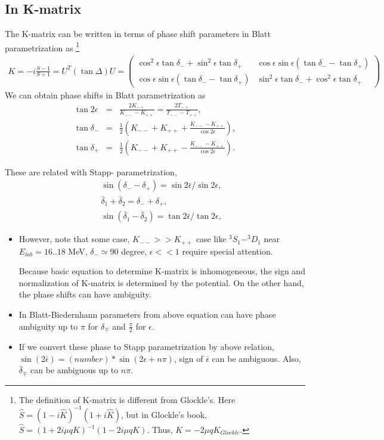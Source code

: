 \documentclass[10pt]{article}
\newcommand{\bea}{\begin{eqnarray}}
\newcommand{\eea}{\end{eqnarray}}
\newcommand{\no}{\nonumber \\}
\begin{document}
\subsection{In K-matrix}
The K-matrix can be written in terms of phase shift parameters
in Blatt parametrization as
\footnote{
The definition of K-matrix is different  from Glockle's.
Here $\hat{S}=(1-i\hat K)^{-1}(1+i\hat{K})$, but in 
Glockle's book, $\hat{S}=(1+2i\mu q K)^{-1}(1-2i\mu q K)$.
Thus, $K=-2\mu q K_{Glockle}$.
}
\bea
K=-i\frac{S-1}{S+1}=U^T (\tan\Delta) U
 =\left(\begin{array}{cc}
   \cos^2\epsilon\tan\delta_{-}+\sin^2\epsilon\tan\delta_{+} &
   \cos\epsilon\sin\epsilon(\tan\delta_{-}-\tan\delta_{+})\\
   \cos\epsilon\sin\epsilon(\tan\delta_{-}-\tan\delta_{+}) &
   \sin^2\epsilon\tan\delta_{-}+\cos^2\epsilon\tan\delta_{+} 
   \end{array}
 \right) 
\eea
We can obtain phase shifts in Blatt parametrization as
\bea
\tan 2\epsilon &=& \frac{2 K_{-+}}{K_{--}-K_{++}}
                =\frac{2 T_{-+}}{T_{--}-T_{++}}  ,\no
\tan \delta_{-} &=& 
    \frac{1}{2}\left(K_{--}+K_{++}
    +\frac{K_{--}-K_{++}}{\cos 2\epsilon}\right),\no
\tan\delta_{+} &=&
     \frac{1}{2}\left(K_{--}+K_{++}
    -\frac{K_{--}-K_{++}}{\cos 2\epsilon}\right).
\eea

These are related with Stapp- parametrization,
\bea
& &\sin(\delta_{-}-\delta_{+})=\sin 2\bar{\epsilon}/\sin 2\epsilon,\no
& &\bar{\delta}_1+\bar{\delta}_2=\delta_{-}+\delta_{+},\no
& &\sin(\bar{\delta}_1-\bar{\delta}_2)=\tan 2\bar{\epsilon}/\tan 2\epsilon,
\eea

\begin{itemize}
\item However, note that some case, $K_{--}>>K_{++}$ case
like $^3S_1-^3D_1$ near $E_{lab}=16..18$ MeV, $\delta_{-}\simeq 90$
degree, $\epsilon<<1$ require special attention.

Because basic equation to determine K-matrix is inhomogeneous,
the sign and normalization of K-matrix is determined by the potential.
On the other hand, the phase shifts can have ambiguity.

\item In Blatt-Biedernhann parameters from above equation can have 
phase ambiguity up to $\pi$ for $\delta_{\mp}$ and $\frac{\pi}{2}$ for $\epsilon$.

\item If we convert these phase to Stapp parametrization by above relation,
$\sin(2\bar{\epsilon})=(number)*\sin(2\epsilon+n\pi)$, 
sign of $\bar{\epsilon}$ can be ambiguous.
Also, $\bar{\delta}_{\mp}$ can be ambiguous up to $n\pi$.
\end{itemize}
\end{document}
